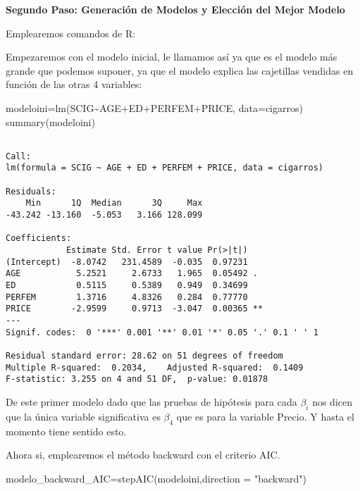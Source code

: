 \documentclass[
  a4paper,
  oneside,
  openany]{book}
\newenvironment{Shaded}{\begin{snugshade}}{\end{snugshade}}
\newcommand{\AttributeTok}[1]{\textcolor[rgb]{0.77,0.63,0.00}{#1}}
\newcommand{\FunctionTok}[1]{\textcolor[rgb]{0.00,0.00,0.00}{#1}}
\newcommand{\NormalTok}[1]{#1}
\newcommand{\OtherTok}[1]{\textcolor[rgb]{0.56,0.35,0.01}{#1}}
\newcommand{\SpecialCharTok}[1]{\textcolor[rgb]{0.00,0.00,0.00}{#1}}
\newcommand{\StringTok}[1]{\textcolor[rgb]{0.31,0.60,0.02}{#1}}
\begin{document}
\textbf{Segundo Paso: Generación de Modelos y Elección del Mejor Modelo}

Emplearemos comandos de R:

Empezaremos con el modelo inicial, le llamamos así ya que es el modelo más grande que podemos suponer, ya que el modelo explica las cajetillas vendidas en función de las otras 4 variables:

\begin{Shaded}
\begin{Highlighting}[]
\NormalTok{modeloini}\OtherTok{=}\FunctionTok{lm}\NormalTok{(SCIG}\SpecialCharTok{\textasciitilde{}}\NormalTok{AGE}\SpecialCharTok{+}\NormalTok{ED}\SpecialCharTok{+}\NormalTok{PERFEM}\SpecialCharTok{+}\NormalTok{PRICE, }\AttributeTok{data=}\NormalTok{cigarros) }
\FunctionTok{summary}\NormalTok{(modeloini)}
\end{Highlighting}
\end{Shaded}

\begin{verbatim}

Call:
lm(formula = SCIG ~ AGE + ED + PERFEM + PRICE, data = cigarros)

Residuals:
    Min      1Q  Median      3Q     Max 
-43.242 -13.160  -5.053   3.166 128.099 

Coefficients:
            Estimate Std. Error t value Pr(>|t|)   
(Intercept)  -8.0742   231.4589  -0.035  0.97231   
AGE           5.2521     2.6733   1.965  0.05492 . 
ED            0.5115     0.5389   0.949  0.34699   
PERFEM        1.3716     4.8326   0.284  0.77770   
PRICE        -2.9599     0.9713  -3.047  0.00365 **
---
Signif. codes:  0 '***' 0.001 '**' 0.01 '*' 0.05 '.' 0.1 ' ' 1

Residual standard error: 28.62 on 51 degrees of freedom
Multiple R-squared:  0.2034,    Adjusted R-squared:  0.1409 
F-statistic: 3.255 on 4 and 51 DF,  p-value: 0.01878
\end{verbatim}

De este primer modelo dado que las pruebas de hipótesis para cada \(\beta_{i}\) nos dicen que la única variable significativa es \(\beta_{4}\) que es para la variable Precio. Y hasta el momento tiene sentido esto.

Ahora si, emplearemos el método backward con el criterio AIC.

\begin{Shaded}
\begin{Highlighting}[]
\NormalTok{modelo\_backward\_AIC}\OtherTok{=}\FunctionTok{stepAIC}\NormalTok{(modeloini,}\AttributeTok{direction =} \StringTok{"backward"}\NormalTok{)}
\end{Highlighting}
\end{Shaded}
\end{document}
